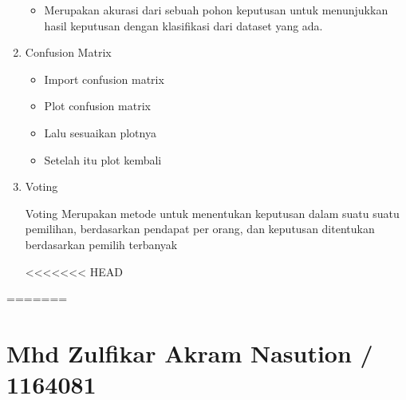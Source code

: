 \begin{enumerate}
\begin{itemize}
\item Merupakan akurasi dari sebuah pohon keputusan untuk menunjukkan hasil keputusan dengan klasifikasi dari dataset yang ada.
\end{itemize}
\item Confusion Matrix
\begin{itemize}
\item Import confusion matrix
\item Plot confusion matrix
\item Lalu sesuaikan plotnya
\item Setelah itu plot kembali
\end{itemize}
\item Voting
\par
Voting Merupakan metode untuk menentukan keputusan dalam suatu suatu pemilihan, berdasarkan pendapat per orang, dan keputusan ditentukan berdasarkan pemilih terbanyak

<<<<<<< HEAD
\end{enumerate}
=======
\section {Mhd Zulfikar Akram Nasution / 1164081}
